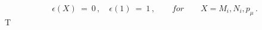 \begin{equation} \epsilon(X) \ = \
0\, ,\quad \epsilon(1) \ = \ 1\, ,\qquad for \qquad X= M_i, N_i,
p_\mu\, .\label{r25}\end{equation}T
